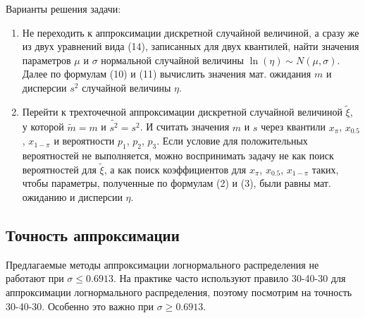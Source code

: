 \documentclass[12pt]{article}
\begin{document}
	Варианты решения задачи:
	\begin{enumerate}
		\item Не переходить к аппроксимации дискретной случайной величиной, а сразу же из двух уравнений вида (14), записанных для двух квантилей, найти значения параметров $\mu$ и $\sigma$ нормальной случайной величины $\ln(\eta)\sim N(\mu, \sigma)$. Далее по формулам (10) и (11) вычислить значения мат. ожидания $m$ и дисперсии $s^{2}$ случайной величины $\eta$.
		\item Перейти к трехточечной аппроксимации дискретной случайной величиной $\tilde{\xi}$, у которой $\tilde{m} = m$ и $\tilde{s^{2}}=s^{2}$. И считать значения $m$ и $s$ через квантили $x_{\pi}$, $x_{0.5}$, $x_{1-\pi}$ и вероятности $p_{1}$, $p_{2}$, $p_{3}$.
		Если условие для положительных вероятностей не выполняется, можно воспринимать задачу не как поиск вероятностей для $\tilde{\xi}$, а как поиск коэффициентов для $x_{\pi}$, $x_{0.5}$, $x_{1-\pi}$ таких, чтобы параметры, полученные по формулам (2) и (3), были равны мат. ожиданию и дисперсии $\eta$. 
	\end{enumerate}
	
	\subsection{Точность аппроксимации}
	
	Предлагаемые методы аппроксимации логнормального распределения не работают при $\sigma \leq 0.6913$. На практике часто используют правило 30-40-30 для аппроксимации логнормального распределения, поэтому посмотрим на точность 30-40-30. Особенно это важно при $\sigma \geq 0.6913$.
	
\end{document}

